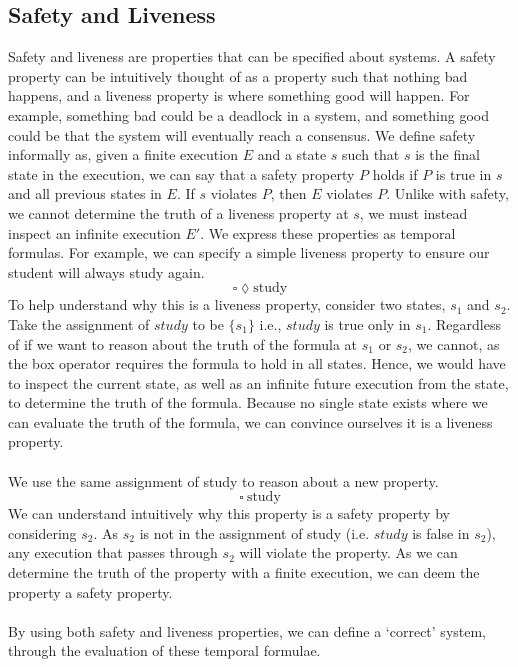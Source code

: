 \subsection{Safety and Liveness}
Safety and liveness are properties that can be specified about systems. A safety property can be intuitively thought of as a property such that nothing bad happens, and a liveness property is where something good will happen. For example, something bad could be a deadlock in a system, and something good could be that the system will eventually reach a consensus. We define safety informally as, given a finite execution $E$ and a state $s$ such that $s$ is the final state in the execution, we can say that a safety property $P$ holds if $P$ is true in $s$ and all previous states in $E$. If $s$ violates $P$, then $E$ violates $P$. Unlike with safety, we cannot determine the truth of a liveness property at $s$, we must instead inspect an infinite execution $E'$. We express these properties as temporal formulas. For example, we can specify a simple liveness property to ensure our student will always study again.
\[
\square \lozenge \text{study}
\]
To help understand why this is a liveness property, consider two states, $s_1$ and $s_2$. Take the assignment of $study$ to be $\{s_1\}$ i.e., $study$ is true only in $s_1$. Regardless of if we want to reason about the truth of the formula at $s_1$ or $s_2$, we cannot, as the box operator requires the formula to hold in all states. Hence, we would have to inspect the current state, as well as an infinite future execution from the state, to determine the truth of the formula. Because no single state exists where we can evaluate the truth of the formula, we can convince ourselves it is a liveness property.
\\ \\
We use the same assignment of study to reason about a new property.
\[
\square \ \text{study}
\]
We can understand intuitively why this property is a safety property by considering $s_2$. As $s_2$ is not in the assignment of study (i.e. $study$ is false in $s_2$), any execution that passes through $s_2$ will violate the property. As we can determine the truth of the property with a finite execution, we can deem the property a safety property.
\\ \\
By using both safety and liveness properties, we can define a `correct' system, through the evaluation of these temporal formulae.
